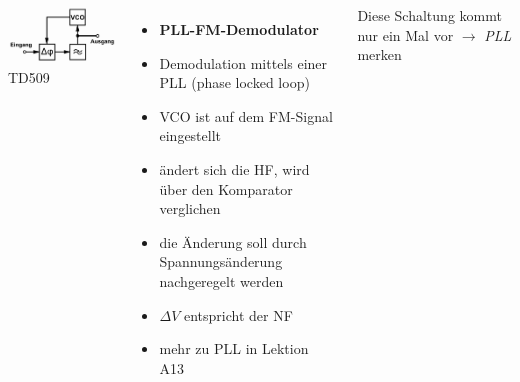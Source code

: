 \begin{frame}
  \begin{columns}
    \includegraphics[width=\textwidth,height=.85\textheight,keepaspectratio]{a12/td509.png}\\
    {\tiny TD509}
    \begin{itemize}
      \item \textbf{PLL-FM-Demodulator}
      \item Demodulation mittels einer PLL (phase locked loop)
      \item VCO ist auf dem FM-Signal eingestellt
      \item ändert sich die HF, wird über den Komparator verglichen
      \item die Änderung soll durch Spannungsänderung nachgeregelt werden
      \item $\Delta V$ entspricht der NF
      \item mehr zu PLL in Lektion A13
    \end{itemize}
    {\small Diese Schaltung kommt nur ein Mal vor $\rightarrow$ \emph{PLL} merken}
  \end{columns}
\end{frame}

